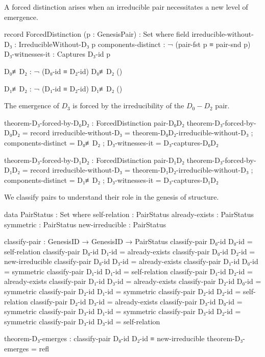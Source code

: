 \documentclass[11pt,a4paper]{book}
\begin{document}
A forced distinction arises when an irreducible pair necessitates a new level of emergence.

\begin{code}
record ForcedDistinction (p : GenesisPair) : Set where
  field
    irreducible-without-D₃ : IrreducibleWithout-D₃ p
    components-distinct : ¬ (pair-fst p ≡ pair-snd p)
    D₃-witnesses-it : Captures D₃-id p

D₀≢D₂ : ¬ (D₀-id ≡ D₂-id)
D₀≢D₂ ()

D₁≢D₂ : ¬ (D₁-id ≡ D₂-id)
D₁≢D₂ ()

\end{code}

The emergence of $D_3$ is forced by the irreducibility of the $D_0-D_2$ pair.

\begin{code}
theorem-D₃-forced-by-D₀D₂ : ForcedDistinction pair-D₀D₂
theorem-D₃-forced-by-D₀D₂ = record
  { irreducible-without-D₃ = theorem-D₀D₂-irreducible-without-D₃
  ; components-distinct = D₀≢D₂
  ; D₃-witnesses-it = D₃-captures-D₀D₂
  }

theorem-D₃-forced-by-D₁D₂ : ForcedDistinction pair-D₁D₂
theorem-D₃-forced-by-D₁D₂ = record
  { irreducible-without-D₃ = theorem-D₁D₂-irreducible-without-D₃
  ; components-distinct = D₁≢D₂
  ; D₃-witnesses-it = D₃-captures-D₁D₂
  }
\end{code}

We classify pairs to understand their role in the genesis of structure.

\begin{code}
data PairStatus : Set where
  self-relation   : PairStatus
  already-exists  : PairStatus
  symmetric       : PairStatus
  new-irreducible : PairStatus

classify-pair : GenesisID → GenesisID → PairStatus
classify-pair D₀-id D₀-id = self-relation
classify-pair D₀-id D₁-id = already-exists
classify-pair D₀-id D₂-id = new-irreducible
classify-pair D₀-id D₃-id = already-exists
classify-pair D₁-id D₀-id = symmetric
classify-pair D₁-id D₁-id = self-relation
classify-pair D₁-id D₂-id = already-exists
classify-pair D₁-id D₃-id = already-exists
classify-pair D₂-id D₀-id = symmetric
classify-pair D₂-id D₁-id = symmetric
classify-pair D₂-id D₂-id = self-relation
classify-pair D₂-id D₃-id = already-exists
classify-pair D₃-id D₀-id = symmetric
classify-pair D₃-id D₁-id = symmetric
classify-pair D₃-id D₂-id = symmetric
classify-pair D₃-id D₃-id = self-relation

theorem-D₃-emerges : classify-pair D₀-id D₂-id ≡ new-irreducible
theorem-D₃-emerges = refl
\end{code}
\end{document}
